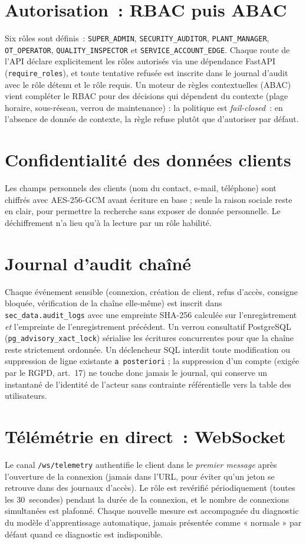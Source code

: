 \documentclass[11pt,a4paper]{report}
\begin{document}
\section{Autorisation~: RBAC puis ABAC}
Six rôles sont définis~: \texttt{SUPER\_ADMIN}, \texttt{SECURITY\_AUDITOR},
\texttt{PLANT\_MANAGER}, \texttt{OT\_OPERATOR}, \texttt{QUALITY\_INSPECTOR} et
\texttt{SERVICE\_ACCOUNT\_EDGE}. Chaque route de l'API déclare explicitement
les rôles autorisés via une dépendance FastAPI (\texttt{require\_roles}), et
toute tentative refusée est inscrite dans le journal d'audit avec le rôle
détenu et le rôle requis. Un moteur de règles contextuelles (ABAC) vient
compléter le RBAC pour des décisions qui dépendent du contexte (plage horaire,
sous-réseau, verrou de maintenance) : la politique est \emph{fail-closed}~:
en l'absence de donnée de contexte, la règle refuse plutôt que d'autoriser par
défaut.

\section{Confidentialité des données clients}
Les champs personnels des clients (nom du contact, e-mail, téléphone) sont
chiffrés avec AES-256-GCM avant écriture en base ; seule la raison sociale
reste en clair, pour permettre la recherche sans exposer de donnée
personnelle. Le déchiffrement n'a lieu qu'à la lecture par un rôle habilité.

\section{Journal d'audit chaîné}
Chaque événement sensible (connexion, création de client, refus d'accès,
consigne bloquée, vérification de la chaîne elle-même) est inscrit dans
\texttt{sec\_data.audit\_logs} avec une empreinte SHA-256 calculée sur
l'enregistrement \emph{et} l'empreinte de l'enregistrement précédent. Un
verrou consultatif PostgreSQL (\texttt{pg\_advisory\_xact\_lock}) sérialise les
écritures concurrentes pour que la chaîne reste strictement ordonnée. Un
déclencheur SQL interdit toute modification ou suppression de ligne existante
\texttt{a posteriori} ; la suppression d'un compte (exigée par le RGPD,
art.~17) ne touche donc jamais le journal, qui conserve un instantané de
l'identité de l'acteur sans contrainte référentielle vers la table des
utilisateurs.

\section{Télémétrie en direct~: WebSocket}
Le canal \texttt{/ws/telemetry} authentifie le client dans le \emph{premier
message} après l'ouverture de la connexion (jamais dans l'URL, pour éviter
qu'un jeton se retrouve dans des journaux d'accès). Le rôle est revérifié
périodiquement (toutes les 30~secondes) pendant la durée de la connexion, et
le nombre de connexions simultanées est plafonné. Chaque nouvelle mesure est
accompagnée du diagnostic du modèle d'apprentissage automatique, jamais
présentée comme « normale » par défaut quand ce diagnostic est
indisponible.
\end{document}
